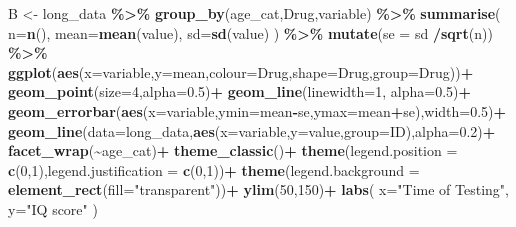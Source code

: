 \documentclass[
]{book}
\newenvironment{Shaded}{\begin{snugshade}}{\end{snugshade}}
\newcommand{\AttributeTok}[1]{\textcolor[rgb]{0.13,0.29,0.53}{#1}}
\newcommand{\DecValTok}[1]{\textcolor[rgb]{0.00,0.00,0.81}{#1}}
\newcommand{\FloatTok}[1]{\textcolor[rgb]{0.00,0.00,0.81}{#1}}
\newcommand{\FunctionTok}[1]{\textcolor[rgb]{0.13,0.29,0.53}{\textbf{#1}}}
\newcommand{\NormalTok}[1]{#1}
\newcommand{\OtherTok}[1]{\textcolor[rgb]{0.56,0.35,0.01}{#1}}
\newcommand{\SpecialCharTok}[1]{\textcolor[rgb]{0.81,0.36,0.00}{\textbf{#1}}}
\newcommand{\StringTok}[1]{\textcolor[rgb]{0.31,0.60,0.02}{#1}}
\begin{document}
\begin{Shaded}
\begin{Highlighting}[]
\NormalTok{B }\OtherTok{\textless{}{-}}\NormalTok{ long\_data }\SpecialCharTok{\%\textgreater{}\%}
  \FunctionTok{group\_by}\NormalTok{(age\_cat,Drug,variable) }\SpecialCharTok{\%\textgreater{}\%}
  \FunctionTok{summarise}\NormalTok{(}
    \AttributeTok{n=}\FunctionTok{n}\NormalTok{(),}
    \AttributeTok{mean=}\FunctionTok{mean}\NormalTok{(value),}
    \AttributeTok{sd=}\FunctionTok{sd}\NormalTok{(value)}
\NormalTok{  ) }\SpecialCharTok{\%\textgreater{}\%} \FunctionTok{mutate}\NormalTok{(}\AttributeTok{se =}\NormalTok{ sd }\SpecialCharTok{/}\FunctionTok{sqrt}\NormalTok{(n)) }\SpecialCharTok{\%\textgreater{}\%}
  \FunctionTok{ggplot}\NormalTok{(}\FunctionTok{aes}\NormalTok{(}\AttributeTok{x=}\NormalTok{variable,}\AttributeTok{y=}\NormalTok{mean,}\AttributeTok{colour=}\NormalTok{Drug,}\AttributeTok{shape=}\NormalTok{Drug,}\AttributeTok{group=}\NormalTok{Drug))}\SpecialCharTok{+}
  \FunctionTok{geom\_point}\NormalTok{(}\AttributeTok{size=}\DecValTok{4}\NormalTok{,}\AttributeTok{alpha=}\FloatTok{0.5}\NormalTok{)}\SpecialCharTok{+}
  \FunctionTok{geom\_line}\NormalTok{(}\AttributeTok{linewidth=}\DecValTok{1}\NormalTok{, }\AttributeTok{alpha=}\FloatTok{0.5}\NormalTok{)}\SpecialCharTok{+}
  \FunctionTok{geom\_errorbar}\NormalTok{(}\FunctionTok{aes}\NormalTok{(}\AttributeTok{x=}\NormalTok{variable,}\AttributeTok{ymin=}\NormalTok{mean}\SpecialCharTok{{-}}\NormalTok{se,}\AttributeTok{ymax=}\NormalTok{mean}\SpecialCharTok{+}\NormalTok{se),}\AttributeTok{width=}\FloatTok{0.5}\NormalTok{)}\SpecialCharTok{+}
  \FunctionTok{geom\_line}\NormalTok{(}\AttributeTok{data=}\NormalTok{long\_data,}\FunctionTok{aes}\NormalTok{(}\AttributeTok{x=}\NormalTok{variable,}\AttributeTok{y=}\NormalTok{value,}\AttributeTok{group=}\NormalTok{ID),}\AttributeTok{alpha=}\FloatTok{0.2}\NormalTok{)}\SpecialCharTok{+}
  \FunctionTok{facet\_wrap}\NormalTok{(}\SpecialCharTok{\textasciitilde{}}\NormalTok{age\_cat)}\SpecialCharTok{+}
  \FunctionTok{theme\_classic}\NormalTok{()}\SpecialCharTok{+}
  \FunctionTok{theme}\NormalTok{(}\AttributeTok{legend.position =} \FunctionTok{c}\NormalTok{(}\DecValTok{0}\NormalTok{,}\DecValTok{1}\NormalTok{),}\AttributeTok{legend.justification =} \FunctionTok{c}\NormalTok{(}\DecValTok{0}\NormalTok{,}\DecValTok{1}\NormalTok{))}\SpecialCharTok{+}
  \FunctionTok{theme}\NormalTok{(}\AttributeTok{legend.background =} \FunctionTok{element\_rect}\NormalTok{(}\AttributeTok{fill=}\StringTok{"transparent"}\NormalTok{))}\SpecialCharTok{+}
  \FunctionTok{ylim}\NormalTok{(}\DecValTok{50}\NormalTok{,}\DecValTok{150}\NormalTok{)}\SpecialCharTok{+}
  \FunctionTok{labs}\NormalTok{(}
    \AttributeTok{x=}\StringTok{"Time of Testing"}\NormalTok{,}
    \AttributeTok{y=}\StringTok{"IQ score"}
\NormalTok{  )}


\end{Highlighting}
\end{Shaded}
\end{document}
